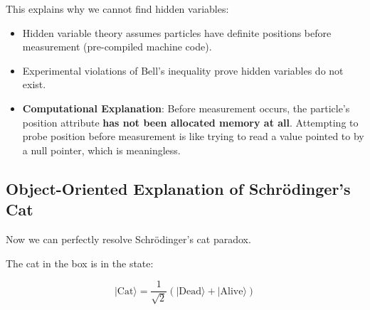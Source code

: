 This explains why we cannot find hidden variables:

\begin{itemize}
\item Hidden variable theory assumes particles have definite positions before measurement (pre-compiled machine code).

\item Experimental violations of Bell's inequality prove hidden variables do not exist.

\item \textbf{Computational Explanation}: Before measurement occurs, the particle's position attribute \textbf{has not been allocated memory at all}. Attempting to probe position before measurement is like trying to read a value pointed to by a null pointer, which is meaningless.
\end{itemize}

\subsection{Object-Oriented Explanation of Schrödinger's Cat}

Now we can perfectly resolve Schrödinger's cat paradox.

The cat in the box is in the state:

\begin{equation}
|\text{Cat}\rangle = \frac{1}{\sqrt{2}} (|\text{Dead}\rangle + |\text{Alive}\rangle)
\end{equation}

